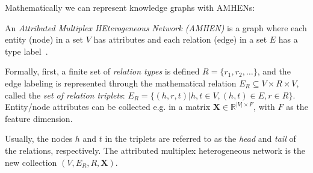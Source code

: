 
Mathematically we can represent knowledge graphs with AMHENs:
\begin{definition}
An \emph{Attributed Multiplex HEterogeneous Network (AMHEN)} is a graph where each entity (node) in a set $V$ has attributes and each relation (edge) in a set $E$ has a type label~\cite{liu_ahng_2019,cen_representation_2019}. 

Formally, first, a finite set of \emph{relation types} is defined $R = \{r_1,r_2,\dots\}$, and the edge labeling is represented through the mathematical relation $E_R \subseteq V \times R \times V$, called the \emph{set of relation triplets}:  $E_R = \{(h,r,t)|h,t \in V, (h,t) \in E, r \in R\}$. Entity/node attributes can be collected e.g. in a matrix $\mathbf{X} \in \mathbb{R}^{|V| \times F}$, with $F$ as the feature dimension. 

Usually, the nodes $h$ and $t$ in the triplets are referred to as the \emph{head} and \emph{tail} of the relations, respectively. The attributed multiplex heterogeneous network is the new collection $\left(V, E_R, R, \mathbf{X}\right)$.
\end{definition}

